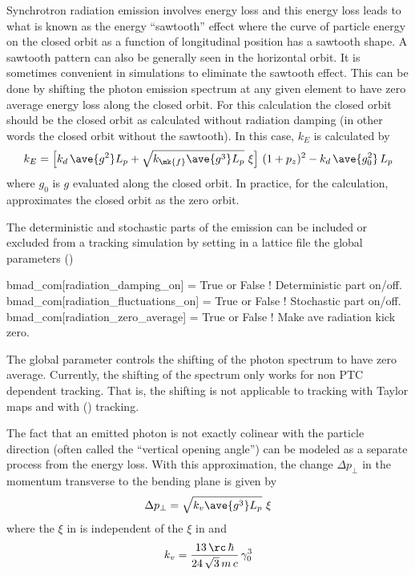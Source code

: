 Synchrotron radiation emission involves energy loss and this energy loss leads to what is known as
the energy ``sawtooth'' effect where the curve of particle energy on the closed orbit as a function
of longitudinal position has a sawtooth shape. A sawtooth pattern can also be generally seen in the
horizontal orbit. It is sometimes convenient in simulations to eliminate the sawtooth effect. This
can be done by shifting the photon emission spectrum at any given element to have zero average
energy loss along the closed orbit. For this calculation the closed orbit should be the closed orbit
as calculated without radiation damping (in other words the closed orbit without the sawtooth). In
this case, $k_E$ is calculated by
\begin{equation}
  k_E = \left[ k_d \, \ave{g^2} L_p + \sqrt{k_\mk{f} \ave{g^3} L_p} \,\, \xi \right] \, (1 + p_z)^2 - 
  k_d \, \ave{g_0^2} \, L_p
\end{equation}
where $g_0$ is $g$ evaluated along the closed orbit. In practice, for the calculation, \bmad
approximates the closed orbit as the zero orbit. 

The deterministic and stochastic parts of the emission can be included or excluded from a tracking
simulation by setting in a lattice file the \bmad global parameters ()
\begin{example}
  bmad_com[radiation_damping_on]      = True or False  ! Deterministic part on/off.
  bmad_com[radiation_fluctuations_on] = True or False  ! Stochastic part on/off.
  bmad_com[radiation_zero_average]    = True or False  ! Make ave radiation kick zero.
\end{example}
The global parameter  controls the shifting of the photon
spectrum to have zero average. Currently, the shifting of the spectrum only works for non PTC
dependent tracking. That is, the shifting is not applicable to tracking with Taylor maps and with
 () tracking.

The fact that an emitted photon is not exactly colinear with the particle direction (often called
the ``vertical opening angle'') can be modeled as a separate process from the energy loss. With this
approximation, the change $\Delta p_\perp$ in the momentum transverse to the bending plane is given
by
\begin{equation}
  \Delta p_\perp = \sqrt{k_v \ave{g^3} L_p} \,\, \xi
  \label{dpkgl}
\end{equation}
where the $\xi$ in  is independent of the $\xi$ in  and
\begin{equation}
 k_v = \frac{13 \, \rc \, \hbar}{24 \, \sqrt{3} \, m \, c} \, \gamma_0^3
\end{equation}

